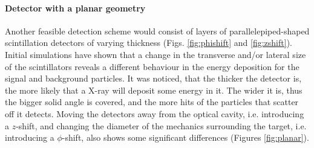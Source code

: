 \documentclass[12pt]{article}
\begin{document}
\paragraph{Detector with a planar geometry}
Another feasible detection scheme would consist of layers of parallelepiped-shaped scintillation detectors of varying thickness (Figs. \ref{fig:phishift} and \ref{fig:zshift}). Initial simulations have shown that a change in the transverse and/or lateral size of the scintillators reveals a different behaviour in the energy deposition for the signal and background particles. It was noticed, that the thicker the detector is, the more likely that a X-ray will deposit some energy in it. The wider it is, thus the bigger solid angle is covered, and the more hits of the particles that scatter off it detects. Moving the detectors away from the optical cavity, i.e. introducing a $z$-shift, and changing the diameter of the mechanics surrounding the target, i.e. introducing a $\phi$-shift, also shows some significant differences (Figures \ref{fig:planar}).
\end{document}
